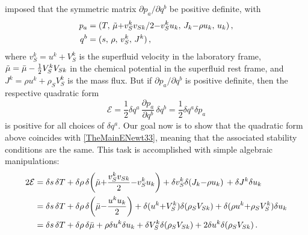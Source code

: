 \documentclass[a4paper, amsfonts, amssymb, amsmath, reprint, showkeys, nofootinbib, twoside,notitlepage,onecolumn]{revtex4-2}
\theoremstyle{definition}
\theoremstyle{theorem}
\theoremstyle{corollary}
\begin{document}
\citet{Andreev2004} imposed that the symmetric matrix $\partial p_a/\partial q^b$ be positive definite, with 
\begin{equation}
\begin{split}
p_a={}& (T, \, \Tilde{\mu}{+}v_S^k v_{Sk}/2{-}v_S^k u_k, \, J_k{-}\rho u_k, \, u_k) \, , \\
q^b={}& (s, \, \rho, \, v_{S}^k, \, J^k) \, , \\
\end{split}
\end{equation}
where $v_S^k=u^k+V_S^k$ is the superfluid velocity in the laboratory frame, $\Tilde{\mu}=\Bar{\mu} -\frac{1}{2}V_S^k V_{Sk}$ in the chemical potential in the superfluid rest frame, and $J^k= \rho u^k +\rho_S V_S^k$ is the mass flux. But if $\partial p_a/\partial q^b$ is positive definite, then the respective quadratic form
\begin{equation}
\mathcal{E}=\dfrac{1}{2} \delta q^a \, \dfrac{\partial p_a}{\partial q^b} \, \delta q^b = \dfrac{1}{2} \delta q^a \delta p_a
\end{equation}
is positive for all choices of $\delta q^a$. Our goal now is to show that the quadratic form above coincides with \eqref{TheMainENewt33}, meaning that the associated stability conditions are the same. This task is accomplished with simple algebraic manipulations:
\begin{equation}
\begin{split}
2\mathcal{E} ={}& \delta s \, \delta T +\delta \rho \, \delta \bigg(\Tilde{\mu}{+}\dfrac{v_S^k v_{Sk}}{2}{-}v_S^k u_k\bigg) +\delta v_{S}^k \delta (J_k{-}\rho u_k) \, +\delta J^k \delta u_k \\
={}& \delta s \, \delta T +\delta \rho \, \delta \bigg(\Bar{\mu}{-}\dfrac{u^k u_{k}}{2}\bigg) +\delta( u^k {+} V_{S}^k) \delta (\rho_S V_{Sk})  +\delta (\rho u^k {+}\rho_S V_S^k) \delta u_k \\
={}& \delta s \, \delta T +\delta \rho \, \delta \Bar{\mu}+ \rho \delta u^k \delta u_k +\delta V_{S}^k \delta (\rho_S V_{Sk})+2 \delta u^k\delta(\rho_S V_{Sk}) \, . \\
\end{split}
\end{equation}






\label{lastpage}
\end{document}
